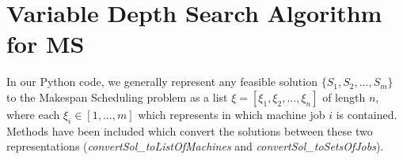 \documentclass[12pt,a4paper,reqno]{article}
\begin{document}
\newpage













\section{Variable Depth Search Algorithm for MS}

In our Python code, we generally represent any feasible solution $\{S_1,S_2,...,S_m\}$ to the Makespan Scheduling problem as a list $\xi = [\xi_1,\xi_2,...,\xi_n]$ of length $n$, where each $\xi_i \in [1,...,m]$ which represents in which machine job $i$ is contained. Methods have been included which convert the solutions between these two representations (\textit{convertSol\_toListOfMachines} and \textit{convertSol\_toSetsOfJobs}). \\
\end{document}

